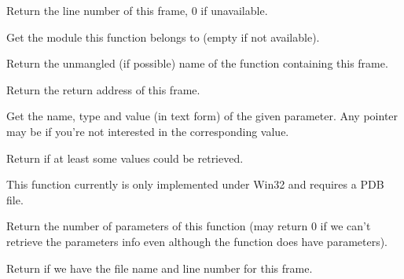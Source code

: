 \label{wxstackframegetline}


Return the line number of this frame, $0$ if unavailable.




\label{wxstackframegetmodule}


Get the module this function belongs to (empty if not available).


\label{wxstackframegetname}


Return the unmangled (if possible) name of the function containing this
frame.


\label{wxstackframegetoffset}


Return the return address of this frame.


\label{wxstackframegetparam}


Get the name, type and value (in text form) of the given parameter.
Any pointer may be  if you're not interested in the corresponding
value.

Return \true if at least some values could be retrieved.

This function currently is only implemented under Win32 and requires a PDB
file.


\label{wxstackframegetparamcount}


Return the number of parameters of this function (may return $0$ if we
can't retrieve the parameters info even although the function does have
parameters).


\label{wxstackframehassourcelocation}


Return \true if we have the file name and line number for this frame.


